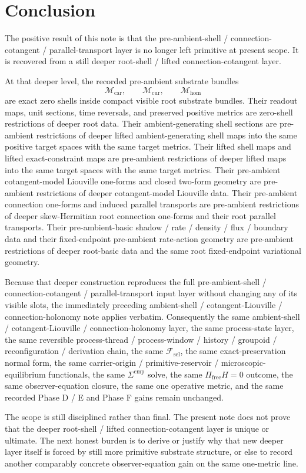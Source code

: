 \documentclass[11pt]{article}
\newcommand{\StemFunctional}{\mathscr F_{\mathrm{sel}}}
\newcommand{\TensorOriginSpace}{\mathcal M_{\mathrm{car}}}
\newcommand{\CurOriginSpace}{\mathcal M_{\mathrm{cur}}}
\newcommand{\HomOriginSpace}{\mathcal M_{\mathrm{hom}}}
\begin{document}
\section{Conclusion}

The positive result of this note is that the pre-ambient-shell / connection-cotangent / parallel-transport layer is no longer left primitive at present scope. It is recovered from a still deeper root-shell / lifted connection-cotangent layer.

At that deeper level, the recorded pre-ambient substrate bundles
\[
\TensorOriginSpace,\qquad
\CurOriginSpace,\qquad
\HomOriginSpace
\]
are exact zero shells inside compact visible root substrate bundles. Their readout maps, unit sections, time reversals, and preserved positive metrics are zero-shell restrictions of deeper root data. Their ambient-generating shell sections are pre-ambient restrictions of deeper lifted ambient-generating shell maps into the same positive target spaces with the same target metrics. Their lifted shell maps and lifted exact-constraint maps are pre-ambient restrictions of deeper lifted maps into the same target spaces with the same target metrics. Their pre-ambient cotangent-model Liouville one-forms and closed two-form geometry are pre-ambient restrictions of deeper cotangent-model Liouville data. Their pre-ambient connection one-forms and induced parallel transports are pre-ambient restrictions of deeper skew-Hermitian root connection one-forms and their root parallel transports. Their pre-ambient-basic shadow / rate / density / flux / boundary data and their fixed-endpoint pre-ambient rate-action geometry are pre-ambient restrictions of deeper root-basic data and the same root fixed-endpoint variational geometry.

Because that deeper construction reproduces the full pre-ambient-shell / connection-cotangent / parallel-transport input layer without changing any of its visible slots, the immediately preceding ambient-shell / cotangent-Liouville / connection-holonomy note applies verbatim. Consequently the same ambient-shell / cotangent-Liouville / connection-holonomy layer, the same process-state layer, the same reversible process-thread / process-window / history / groupoid / reconfiguration / derivation chain, the same \(\StemFunctional\), the same exact-preservation normal form, the same carrier-origin / primitive-reservoir / microscopic-equilibrium functionals, the same \(\Sigma^{\mathrm{cmp}}\) solve, the same \(\Pi_{\mathrm{free}}H=0\) outcome, the same observer-equation closure, the same one operative metric, and the same recorded Phase D / E and Phase F gains remain unchanged.

The scope is still disciplined rather than final. The present note does not prove that the deeper root-shell / lifted connection-cotangent layer is unique or ultimate. The next honest burden is to derive or justify why that new deeper layer itself is forced by still more primitive substrate structure, or else to record another comparably concrete observer-equation gain on the same one-metric line.
\end{document}

